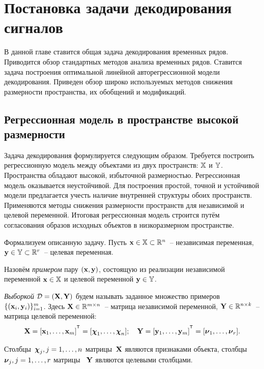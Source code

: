 \chapter{Постановка задачи декодирования сигналов}
\label{chapter1}

В данной главе ставится общая задача декодирования временных рядов.
Приводится обзор стандартных методов анализа временных рядов.
Ставится задача построения оптимальной линейной авторегрессионной модели декодирования.
Приведен обзор широко используемых методов снижения размерности пространства, их обобщений и модификаций.

\section{Регрессионная модель в пространстве высокой размерности}

Задача декодирования формулируется следующим образом. 
Требуется построить регрессионную модель между объектами из двух пространств: $\mathbb{X}$ и $\mathbb{Y}$.
Пространства обладают высокой, избыточной размерностью. 
Регрессионная модель оказывается неустойчивой.
Для построения простой, точной и устойчивой модели предлагается учесть наличие внутренней структуры обоих пространств. 
Применяются методы снижения размерности пространств для независимой и целевой переменной. 
Итоговая регрессионная модель строится путём согласования образов исходных объектов в низкоразмерном пространстве. 

Формализуем описанную задачу. 
Пусть $\mathbf{x} \in \mathbb{X} \subset \mathbb{R}^n$~-- независимая переменная, $\mathbf{y} \in \mathbb{Y} \subset \mathbb{R}^r$~-- целевая переменная.

\begin{definition}
	Назовём \textit{примером} пару $(\mathbf{x}, \mathbf{y})$, состоящую из реализации независимой переменной $\mathbf{x} \in \mathbb{X}$ и целевой переменной $\mathbf{y} \in \mathbb{Y}$. 
\end{definition}

\begin{definition}
	\textit{Выборкой} $\mathcal{D}=(\mathbf{X}, \mathbf{Y})$ будем называть заданное множество примеров $\{(\mathbf{x}_i, \mathbf{y}_i)\}_{i=1}^m$. Здесь $\mathbf{X} \in \mathbb{R}^{m \times n}$~-- матрица независимой переменной, $\mathbf{Y} \in \mathbb{R}^{n \times k}$~-- матрица целевой переменной:
	\begin{equation*}
	\bX = [\bx_1, \dots, \bx_m]^{\T} =  [\bchi_1, \dots, \bchi_n]; \quad \bY = [\by_1, \dots, \by_m]^{\T} =  [\bnu_1, \dots, \bnu_r].
	\end{equation*}
	
	Столбцы~$\boldsymbol{\chi}_j, j=1, \dots, n$ матрицы~$\mathbf{X}$ являются признаками объекта, столбцы~$\boldsymbol{\nu}_j, j=1, \dots, r$ матрицы ~$\mathbf{Y}$ являются целевыми столбцами.
	
\end{definition}

